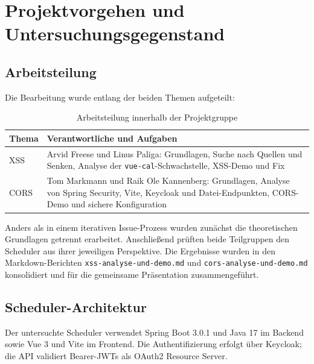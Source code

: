 \section{Projektvorgehen und Untersuchungsgegenstand}
\label{sec:vorgehen}

\subsection{Arbeitsteilung}

Die Bearbeitung wurde entlang der beiden Themen aufgeteilt:

\begin{table}[H]
  \centering
  \caption{Arbeitsteilung innerhalb der Projektgruppe}
  \begin{tabularx}{\textwidth}{lX}
    \toprule
    \textbf{Thema} & \textbf{Verantwortliche und Aufgaben}\\
    \midrule
    XSS & Arvid Freese und Linus Paliga: Grundlagen, Suche nach
    Quellen und Senken, Analyse der \texttt{vue-cal}-Schwachstelle,
    XSS-Demo und Fix\\
    CORS & Tom Markmann und Raik Ole Kannenberg: Grundlagen, Analyse
    von Spring Security, Vite, Keycloak und Datei-Endpunkten,
    CORS-Demo und sichere Konfiguration\\
    \bottomrule
  \end{tabularx}
\end{table}

Anders als in einem iterativen Issue-Prozess wurden zunächst die
theoretischen Grundlagen getrennt erarbeitet. Anschließend prüften
beide Teilgruppen den Scheduler aus ihrer jeweiligen Perspektive. Die
Ergebnisse wurden in den Markdown-Berichten
\texttt{xss-analyse-und-demo.md} und
\texttt{cors-analyse-und-demo.md} konsolidiert und für die gemeinsame
Präsentation zusammengeführt.

\subsection{Scheduler-Architektur}

Der untersuchte Scheduler verwendet Spring Boot 3.0.1 und Java 17 im
Backend sowie Vue 3 und Vite im Frontend. Die Authentifizierung
erfolgt über Keycloak; die API validiert Bearer-JWTs als OAuth2 Resource Server.

